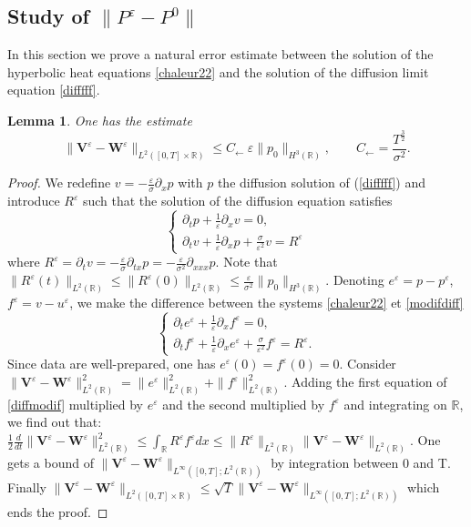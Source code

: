 \documentclass[a4paper,french,english,10pt]{article}
\newcommand\eps{\varepsilon}
\newcommand{\dt}{\partial_t}
\newcommand\V{\mathbf{V}}
\newcommand\W{\mathbf{W}}
\newtheorem{lemma}[theorem]{Lemma}
\begin{document}
\subsection{Study of $\|P^\varepsilon-P^0  \|$}

In this section we prove a natural error estimate \cite{cveps}
between the solution of the
hyperbolic heat equations \eqref{chaleur22} and the solution of the diffusion
limit equation \eqref{difffff}. 


\begin{lemma} \label{heqtode}
One has the estimate
\begin{equation}\label{esti_p_eps_p_0}
\|\V^{\eps}-\W^\eps\|_{L^2([0,T]\times \mathbb{R}) } \leq
 C_\leftarrow \  \eps 
  \|p_0\|_{H^3(\mathbb{R})}, \qquad C_\leftarrow=\frac{T^\frac32}{\sigma^2}.
\end{equation}
\end{lemma}
\begin{proof}
We redefine $v=-\frac{\varepsilon}\sigma \partial_x p$ with $p$ the diffusion solution of (\ref{difffff}) and
introduce $R^{\eps}$ such that the solution of the diffusion equation satisfies
\begin{equation}\label{modifdiff}
\left \{
\begin{array}{lll}
\dt p +\frac{1}{\eps}\partial_{x}v=0,\\
\partial_t v+ \frac{1}{\eps}\partial_x p +\frac{\sigma}{\eps^2}v = R^{\eps}
\end{array}
\right.
\end{equation}
where
 $R^{\eps}=\dt v=-\frac{\varepsilon}\sigma \partial_{tx} p=
-\frac{\varepsilon}{\sigma^2} \partial_{xxx}p$. 
Note that 
$\|R^{\eps}(t)\|_{L^2(\mathbb{R})}\leq \|R^{\eps}(0)\|_{L^2(\mathbb{R})}\leq \frac\varepsilon{\sigma^2}   \|p_0\|_{H^3(\mathbb{R})}$. 
Denoting $e^{\eps}=p-p^{\eps}$, $f^{\eps}=v-u^{\eps}$, we make the difference between the
systems \eqref{chaleur22} et \eqref{modifdiff}
\begin{equation}\label{diffmodif}
\left \{
\begin{array}{lll}
\dt e^{\eps} +\frac{1}{\eps}\partial_{x}f^{\eps}=0,\\
\partial_t f^{\eps} +\frac{1}{\eps}\partial_x e^{\eps} +\frac{\sigma}{\eps^2}f^{\eps} = R^{\eps}.
\end{array}
\right.
\end{equation}
Since data are well-prepared, one has $e^{\eps}(0)=f^{\eps}(0)=0$.
Consider
$\|\V^{\eps}-\W^\eps\|_{L^2(\mathbb{R})}^2=\|e^{\eps}\|_{L^2(\mathbb{R})}
^2+\|f^{\eps}\|_{L^2(\mathbb{R})}^2$.
Adding the first equation of
\eqref{diffmodif} multiplied by $e^{\eps}$ and the second multiplied by $f^{\eps}$ and integrating
on $\mathbb{R}$,
 we find out that:
$\frac12 \frac{d}{dt}\|\V^{\eps}-\W^\eps\|_{L^2(\mathbb{R})}^2 \leq
\int_{\mathbb{R}}R^{\eps}f^{\eps} dx \leq  \|R^{\eps}\|_{L^2(\mathbb{R})}
\|\V^{\eps}-\W^\eps\|_{L^2(\mathbb{R})}
$.
One gets a bound of $\|\V^{\eps}-\W^\eps\|_{ L^\infty([0,T];L^2(\mathbb{R}) )  }$
by integration between 0 and T.
Finally $\|\V^{\eps}-\W^\eps\|_{ L^2([0,T]\times \mathbb{R} )  }\leq \sqrt T \|\V^{\eps}-\W^\eps\|_{ L^\infty([0,T];L^2(\mathbb{R}) )  }$ which ends
the proof.
\end{proof}
\end{document}
